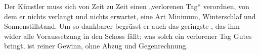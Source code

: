 Der Künstler muss sich von Zeit zu Zeit einen „verlorenen Tag“ verordnen, von dem er nichts verlangt und nichts erwartet, eine Art Minimum, Winterschlaf und Sonnenstillstand. Um so dankbarer begrüsst er auch das geringste , das ihm wider alle Voraussetzung in den Schoss fällt; was solch ein verlorener Tag Gutes bringt, ist reiner Gewinn, ohne Abzug und Gegenrechnung.
\par

